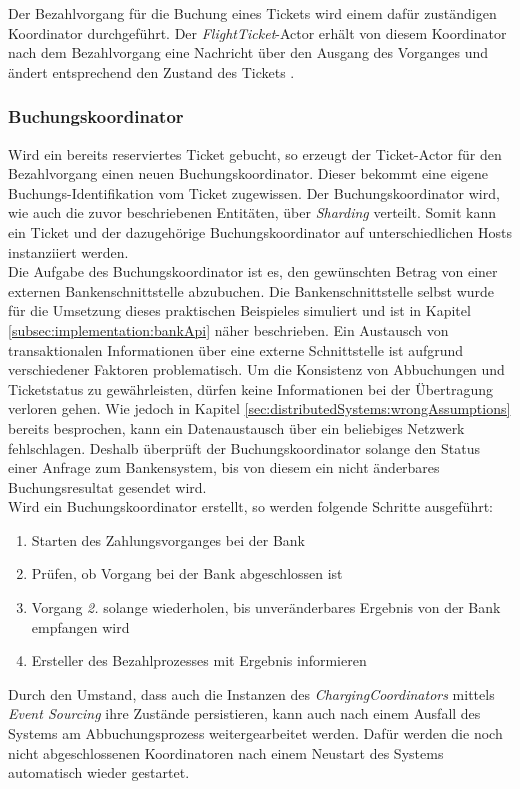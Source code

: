 Der Bezahlvorgang für die Buchung eines Tickets wird einem dafür zuständigen Koordinator durchgeführt. Der \textit{FlightTicket}-Actor erhält von diesem Koordinator nach dem Bezahlvorgang eine Nachricht über den Ausgang des Vorganges und ändert entsprechend den Zustand des Tickets .

\subsubsection{Buchungskoordinator}
\label{subsub:implementation:ChargingCoordinator}
Wird ein bereits reserviertes Ticket gebucht, so erzeugt der Ticket-Actor für den Bezahlvorgang einen neuen Buchungskoordinator. Dieser bekommt eine eigene Buchungs-Identifikation vom Ticket zugewissen. Der Buchungskoordinator wird, wie auch die zuvor beschriebenen Entitäten, über \textit{Sharding} verteilt. Somit kann ein Ticket und der dazugehörige Buchungskoordinator auf unterschiedlichen Hosts instanziiert werden. \\
Die Aufgabe des Buchungskoordinator ist es, den gewünschten Betrag von einer externen Bankenschnittstelle abzubuchen. Die Bankenschnittstelle selbst wurde für die Umsetzung dieses praktischen Beispieles simuliert und ist in Kapitel \ref{subsec:implementation:bankApi} näher beschrieben. Ein Austausch von transaktionalen Informationen über eine externe Schnittstelle ist aufgrund verschiedener Faktoren problematisch. Um die Konsistenz von Abbuchungen und Ticketstatus zu gewährleisten, dürfen keine Informationen bei der Übertragung verloren gehen. Wie jedoch in Kapitel \ref{sec:distributedSystems:wrongAssumptions} bereits besprochen, kann ein Datenaustausch über ein beliebiges Netzwerk fehlschlagen. Deshalb überprüft der Buchungskoordinator solange den Status einer Anfrage zum Bankensystem, bis von diesem ein nicht änderbares Buchungsresultat gesendet wird. \\
Wird ein Buchungskoordinator erstellt, so werden folgende Schritte ausgeführt:
\begin{enumerate}
  \item Starten des Zahlungsvorganges bei der Bank
  \item Prüfen, ob Vorgang bei der Bank abgeschlossen ist
  \item Vorgang \textit{2.} solange wiederholen, bis unveränderbares Ergebnis von der Bank empfangen wird
  \item Ersteller des Bezahlprozesses mit Ergebnis informieren
\end{enumerate}
Durch den Umstand, dass auch die Instanzen des \textit{ChargingCoordinators} mittels \textit{Event Sourcing} ihre Zustände persistieren, kann auch nach einem Ausfall des Systems am Abbuchungsprozess weitergearbeitet werden. Dafür werden die noch nicht abgeschlossenen Koordinatoren nach einem Neustart des Systems automatisch wieder gestartet. \\
